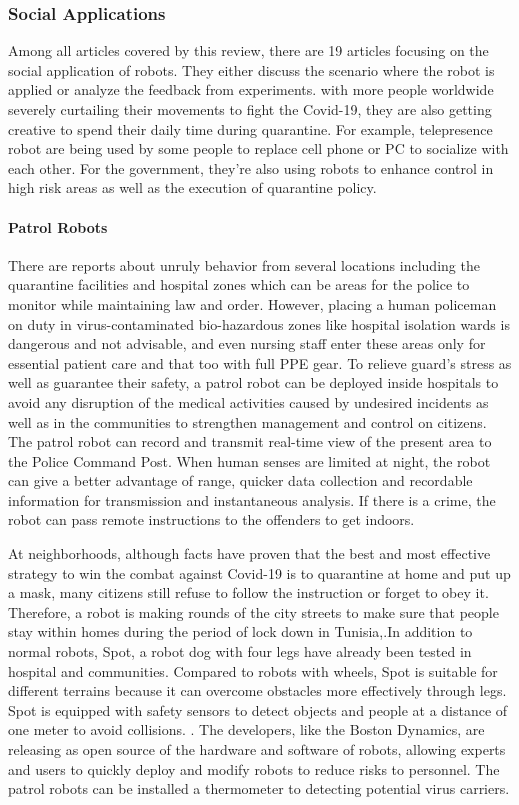 \documentclass[a4paper]{article}
\begin{document}
\subsubsection{Social Applications}
    Among all articles covered by this review, there are 19 articles focusing on the social application of robots. They either discuss the scenario where the robot is applied or analyze the feedback from experiments. with more people worldwide severely curtailing their movements to fight the Covid-19, they are also getting creative to spend their daily time during quarantine. For example, telepresence robot are being used by some people to replace cell phone or PC to socialize with each other. For the government, they're also using robots to enhance control in high risk areas as well as the execution of quarantine policy. 
\paragraph{Patrol Robots}
    There are reports about unruly behavior from several locations including the quarantine facilities and hospital zones which can be areas for the police to monitor while maintaining law and order\cite{36}. However, placing a human policeman on duty in virus-contaminated bio-hazardous zones like hospital isolation wards is dangerous and not advisable, and even nursing staff enter these areas only for essential patient care and that too with full PPE gear. To relieve guard's stress as well as guarantee their safety, a patrol robot can be deployed inside hospitals to avoid any disruption of the medical activities caused by undesired incidents as well as in the communities to strengthen management and control on citizens. The patrol robot  can record and transmit real-time view of the present area to the Police Command Post. When human senses are limited at night, the robot can give a better advantage of range, quicker data collection and recordable information for transmission and instantaneous analysis. If there is a crime, the robot can pass remote instructions to the offenders to get indoors.
\par 
    At neighborhoods, although facts have proven that the best and most effective strategy to win the combat against Covid-19 is to quarantine at home and put up a mask, many citizens still refuse to follow the instruction or forget to obey it. Therefore, a robot is making rounds of the city streets to make sure that people stay within homes during the period of lock down in Tunisia,\cite{39}.In addition to normal robots, Spot, a robot dog with four legs have already been tested in hospital and communities\cite{37}. Compared to robots with wheels, Spot is suitable for different terrains because it can overcome obstacles more effectively through legs. Spot is equipped with safety sensors to detect objects and people at a distance of one meter to avoid collisions\cite{38}.  . The developers, like the Boston Dynamics, are releasing as open source of the hardware and software of robots, allowing experts and users to quickly deploy and modify robots to reduce risks to personnel. The patrol robots can be installed a thermometer to detecting potential virus carriers.
\end{document}
